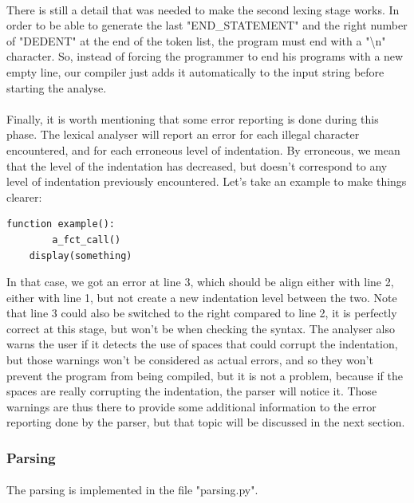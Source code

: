\documentclass[12pt,a4paper]{article}
\begin{document}
\paragraph{}
There is still a detail that was needed to make the second lexing stage works. In order to be able to generate the last "END\_STATEMENT" and the right number of "DEDENT" at the end of the token list, the program must end with a "\textbackslash n" character. So, instead of forcing the programmer to end his programs with a new empty line, our compiler just adds it automatically to the input string before starting the analyse.

\paragraph{}
Finally, it is worth mentioning that some error reporting is done during this phase. The lexical analyser will report an error for each illegal character encountered, and for each erroneous level of indentation. By erroneous, we mean that the level of the indentation has decreased, but doesn't correspond to any level of indentation previously encountered. Let's take an example to make things clearer:
\begin{lstlisting}
function example():
		a_fct_call()
	display(something)
\end{lstlisting}
In that case, we got an error at line 3, which should be align either with line 2, either with line 1, but not create a new indentation level between the two. Note that line 3 could also be switched to the right compared to line 2, it is perfectly correct at this stage, but won't be when checking the syntax. The analyser also warns the user if it detects the use of spaces that could corrupt the indentation, but those warnings won't be considered as actual errors, and so they won't prevent the program from being compiled, but it is not a problem, because if the spaces are really corrupting the indentation, the parser will notice it. Those warnings are thus there to provide some additional  information to the error reporting done by the parser, but that topic will be discussed in the next section.
  
\subsubsection{Parsing}

\paragraph{}
The parsing is implemented in the file "parsing.py".
\end{document}
